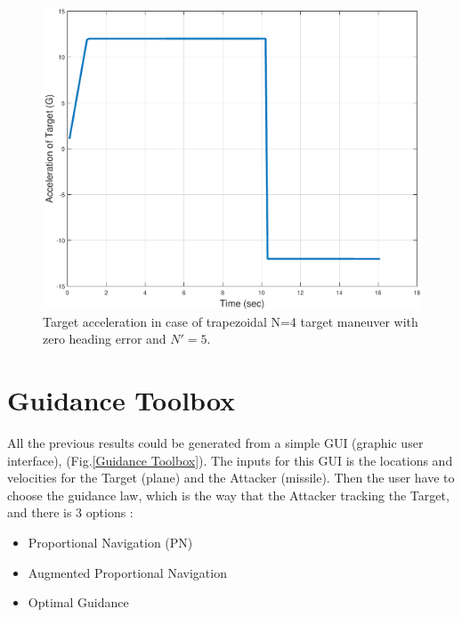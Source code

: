\begin{figure}[H]
	\centering
	\includegraphics[scale = 0.35]{fig/TargetAccelerationTrap.pdf}
	\caption{Target acceleration in case of trapezoidal N=4 target maneuver with zero heading error and $N'=5$.}
	\label{Target acceleration trap}
\end{figure}


\section{Guidance Toolbox}

All the previous results could be generated from a simple GUI (graphic user interface), (Fig.\ref{Guidance Toolbox}).  The inputs for this GUI is the locations and velocities for the Target (plane) and the Attacker (missile). Then the user have to choose the guidance law, which is the way that the Attacker tracking the Target, and there is 3 options :

\begin{itemize}
	\item Proportional Navigation (PN)
	\item Augmented Proportional Navigation
	\item Optimal Guidance
\end{itemize} 

